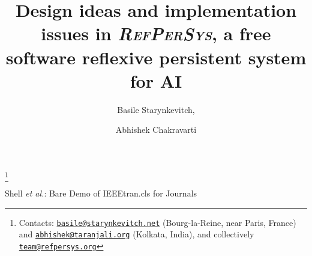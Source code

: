 \documentclass{IEEEtran}
\newcommand{\RefPerSys}{{\textit{\textsc{RefPerSys}}}}
\begin{document}
%
\title{Design ideas and implementation issues in \RefPerSys, a free software reflexive persistent system for AI}
%

\author{Basile Starynkevitch, \and Abhishek Chakravarti}
\thanks{Contacts:
  \href{mailto:basile@starynkevitch.net}{\texttt{basile@starynkevitch.net}}
  (Bourg-la-Reine, near Paris, France) and
  \href{mailto:abhishek@taranjali.org}{\texttt{abhishek@taranjali.org}}
  (Kolkata, India), and collectively
  \href{mailto:team@refpersys.org}{\texttt{team@refpersys.org}}}



%
{Shell \MakeLowercase{\textit{et al.}}: Bare Demo of IEEEtran.cls for Journals}
% 



\maketitle
\thispagestyle{empty}
\end{document}
